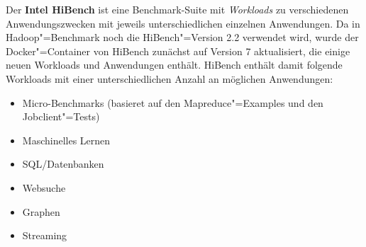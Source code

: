 Der \textbf{Intel HiBench} ist eine Benchmark-Suite mit \emph{Workloads} zu verschiedenen Anwendungszwecken mit jeweils unterschiedlichen einzelnen Anwendungen. Da in Hadoop"=Benchmark noch die HiBench"=Version \mbox{2.2} verwendet wird, wurde der Docker"=Container von HiBench zunächst auf Version 7 aktualisiert, die einige neuen Workloads und Anwendungen enthält. HiBench enthält damit folgende Workloads mit einer unterschiedlichen Anzahl an möglichen Anwendungen:

\begin{itemize}
    \item Micro-Benchmarks (basieret auf den Mapreduce"=Examples und den Jobclient"=Tests)
    \item Maschinelles Lernen
    \item SQL/Datenbanken
    \item Websuche
    \item Graphen
    \item Streaming
\end{itemize}


